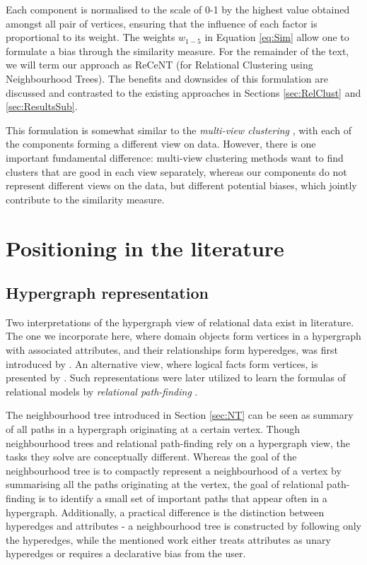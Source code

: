 	
Each component is normalised to the scale of 0-1 by the highest value obtained amongst all pair of vertices, ensuring that the influence of each factor is proportional to its weight.
The weights $w_{1-5}$ in Equation \ref{eq:Sim} allow one to formulate a bias through the similarity measure.
For the remainder of the text, we will term our approach as ReCeNT (for Relational Clustering using Neighbourhood Trees).
The benefits and downsides of this formulation are discussed and contrasted to the existing approaches in Sections \ref{sec:RelClust} and \ref{sec:ResultsSub}.


This formulation is somewhat similar to the \textit{multi-view clustering} \cite{Bickel:2004}, with each of the components forming a different view on data.
However, there is one important fundamental difference: multi-view clustering methods want to find clusters that are good in each view separately, whereas our components do not represent different views on the data, but different potential biases, which jointly contribute to the similarity measure.


\section{Positioning in the literature}


\subsection{Hypergraph representation}

Two interpretations of the hypergraph view of relational data exist in literature.
The one we incorporate here, where domain objects form vertices in a hypergraph with associated attributes, and their relationships form hyperedges, was first introduced by \cite{Richards:92AAb}.
An alternative view, where logical facts form vertices, is presented by \cite{Ong2005}.
Such representations were later utilized to learn the formulas of relational models by \textit{relational path-finding} \cite{kok2010motifs,Richards:92AAb,Ong2005,Lovasz1996}.



The neighbourhood tree introduced in Section \ref{sec:NT} can be seen as summary of all paths in a hypergraph originating at a certain vertex.
Though neighbourhood trees and relational path-finding rely on a hypergraph view, the tasks they solve are conceptually different.
Whereas the goal of the neighbourhood tree is to compactly represent a neighbourhood of a vertex by summarising all the paths originating at the vertex, the goal of relational path-finding is to identify a small set of important paths that appear often in a hypergraph.
Additionally, a practical difference is the distinction between hyperedges and attributes - a neighbourhood tree is constructed by following only the hyperedges, while the mentioned work either treats attributes as unary hyperedges or requires a declarative bias from the user.


